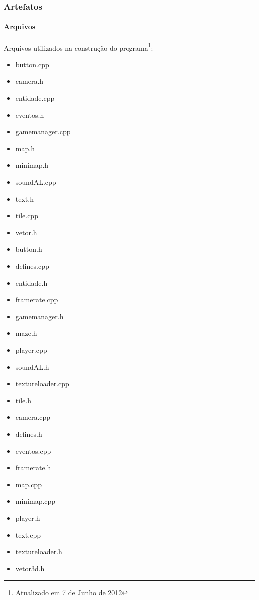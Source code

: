 \subsubsection{Artefatos}\label{artefatos}

\paragraph{\textbf{Arquivos}}

Arquivos utilizados na construção do programa\footnote{Atualizado em 7 de Junho de 2012}:\\

\begin{itemize}
	\item button.cpp
	\item camera.h
	\item entidade.cpp
	\item eventos.h 
	\item gamemanager.cpp  
	\item map.h        
	\item minimap.h   
	\item soundAL.cpp  
	\item text.h             
	\item tile.cpp   
	\item vetor.h
	\item button.h    
	\item defines.cpp  
	\item entidade.h    
	\item framerate.cpp  
	\item gamemanager.h    
	\item maze.h       
	\item player.cpp  
	\item soundAL.h    
	\item textureloader.cpp  
	\item tile.h
	\item camera.cpp  
	\item defines.h    
	\item eventos.cpp   
	\item framerate.h    
	\item map.cpp          
	\item minimap.cpp  
	\item player.h    
	\item text.cpp     
	\item textureloader.h    
	\item vetor3d.h
\end{itemize}

